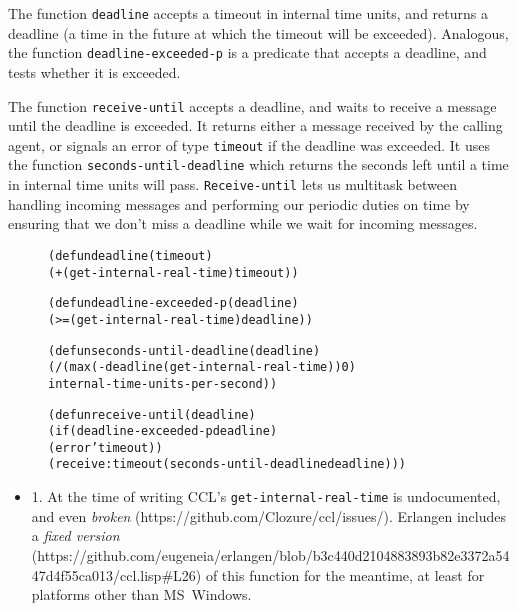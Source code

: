\documentclass [a4paper,12pt,oneside]{article}\usepackage [paper=a4paper,left=37.5264mm,right=37.5264mm,top=37.5264mm,bottom=37.5264mm]{geometry}\usepackage {graphicx}\usepackage {tabularx}\usepackage {alltt}\usepackage {float}\usepackage [section]{placeins}\usepackage {titling}\setlength {\droptitle }{-4em}\pretitle {\begin {flushright}\bfseries \LARGE }\posttitle {\end {flushright}}\preauthor {\begin {flushright}}\postauthor {\end {flushright}}\predate {\begin {flushright}}\postdate {\end {flushright}}\usepackage [english]{babel}\usepackage [T1]{fontenc}\usepackage [utf8x]{inputenc}\usepackage {stmaryrd}\usepackage {amsfonts}\DeclareUnicodeCharacter {12314}{$\llbracket $}\DeclareUnicodeCharacter {12315}{$\rrbracket $}\DeclareUnicodeCharacter {9655}{$\rhd $}\newcommand \nobreakdash {\mbox {-}}\DeclareUnicodeCharacter {8209}{\nobreakdash }\usepackage [sc]{mathpazo}\linespread {1.05}\usepackage [font={small},labelformat=empty,labelsep=none]{caption}\tolerance=10000 \clubpenalty=10000 \widowpenalty=10000 \frenchspacing
\begin{document}
The function \texttt {deadline} accepts a timeout in internal time units, and returns a deadline (a time in the future at which the timeout will be exceeded). Analogous, the function \texttt {deadline-exceeded-p} is a predicate that accepts a deadline, and tests whether it is exceeded.

The function \texttt {receive-until} accepts a deadline, and waits to receive a message until the deadline is exceeded. It returns either a message received by the calling agent, or signals an error of type \texttt {timeout} if the deadline was exceeded. It uses the function \texttt {seconds-until-deadline} which returns the seconds left until a time in internal time units will pass. \texttt {Receive-until} lets us multitask between handling incoming messages and performing our periodic duties on time by ensuring that we don’t miss a deadline while we wait for incoming messages.

\begin {figure}[H]\centering \begin {alltt}
(defun deadline (timeout)
  (+ (get-internal-real-time) timeout))

(defun deadline-exceeded-p (deadline)
  (>= (get-internal-real-time) deadline))

(defun seconds-until-deadline (deadline)
  (/ (max (- deadline (get-internal-real-time)) 0)
     internal-time-units-per-second))

(defun receive-until (deadline)
  (if (deadline-exceeded-p deadline)
      (error 'timeout))
      (receive :timeout (seconds-until-deadline deadline)))
\end{alltt}\vspace {-1em}\end {figure}

\begin {itemize}\raggedright \item 1. At the time of writing CCL’s \texttt {get-internal-real-time} is undocumented, and even \textit {broken} (\textsf {https:/\allowbreak /\allowbreak github.com/\allowbreak Clozure/\allowbreak ccl/\allowbreak issues/}). Erlangen includes a \textit {fixed version} (\textsf {https:/\allowbreak /\allowbreak github.com/\allowbreak eugeneia/\allowbreak erlangen/\allowbreak blob/\allowbreak b3c440d2104883893b82e3372a5447d4f55ca013/\allowbreak ccl.lisp\#\allowbreak L26}) of this function for the meantime, at least for platforms other than MS Windows.\end {itemize}
\end{document}

